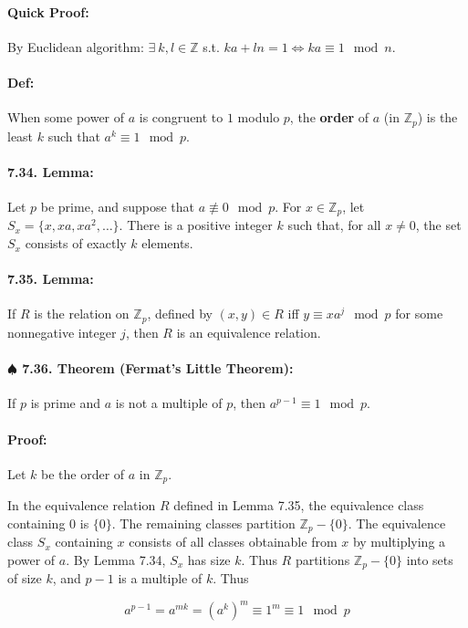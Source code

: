 \documentclass[a4paper, 11pt, twoside]{article}
\begin{document}
\paragraph{Quick Proof:} By Euclidean algorithm: $\exists\ k, l\in \mathbb{Z}$ s.t. $ka+ln=1\iff ka\equiv 1\mod n$.

\paragraph{Def:} When some power of $a$ is congruent to $1$ modulo $p$, the \textbf{order} of $a$ (in $\mathbb{Z}_p$) is the least $k$ such that $a^k\equiv 1\mod p$.

\paragraph{7.34. Lemma:} Let $p$ be prime, and suppose that $a\not\equiv 0\mod p$. For $x\in\mathbb{Z}_p$, let $S_x=\{x,xa,xa^2,\dots\}$. There is a positive integer $k$ such that, for all $x\not=0$, the set $S_x$ consists of exactly $k$ elements.

\paragraph{7.35. Lemma:} If $R$ is the relation on $\mathbb{Z}_p$, defined by $(x,y)\in R$ iff $y\equiv xa^j\mod p$ for some nonnegative integer $j$, then $R$ is an equivalence relation.

\paragraph{$\spadesuit$ 7.36. Theorem (Fermat's Little Theorem):} If $p$ is prime and $a$ is not a multiple of $p$, then $a^{p-1}\equiv 1\mod p$.

\paragraph{Proof:} Let $k$ be the order of $a$ in $\mathbb{Z}_p$.

In the equivalence relation $R$ defined in Lemma 7.35, the equivalence class containing $0$ is $\{0\}$. The remaining classes partition $\mathbb{Z}_p-\{0\}$. The equivalence class $S_x$ containing $x$ consists of all classes obtainable from $x$ by multiplying a power of $a$. By Lemma 7.34, $S_x$ has size $k$. Thus $R$ partitions $\mathbb{Z}_p-\{0\}$ into sets of size $k$, and $p-1$ is a multiple of $k$. Thus

\[a^{p-1}=a^{mk}=(a^k)^m\equiv 1^m\equiv 1\mod p\]
\end{document}
